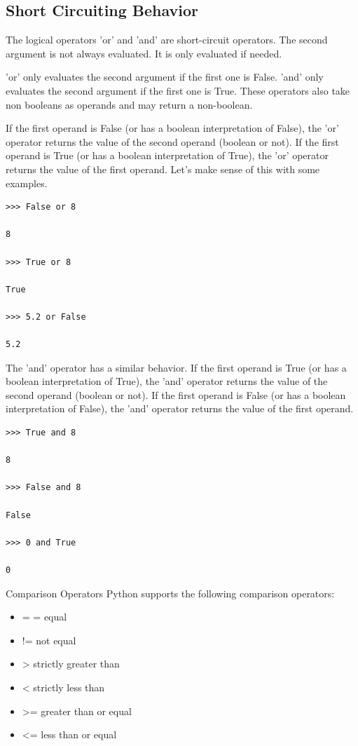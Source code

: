 \documentclass{article}
\begin{document}
\subsection{Short Circuiting Behavior}
The logical operators 'or' and 'and' are short-circuit operators.  The second argument is not always evaluated.  It is only evaluated if needed.

'or' only evaluates the second argument if the first one is False.
'and' only evaluates the second argument if the first one is True.
These operators also take non booleans as operands and may return a non-boolean.

If the first operand is False  (or has a boolean interpretation of False), the 'or' operator returns the value of the second operand (boolean or not).  If the first operand is True (or has a boolean interpretation of True), the 'or' operator returns the value of the first operand.  Let's make sense of this with some examples.

\begin{lstlisting}
>>> False or 8

8

>>> True or 8

True

>>> 5.2 or False

5.2

\end{lstlisting}

The 'and' operator has a similar behavior.  If the first operand is True  (or has a boolean interpretation of True), the 'and' operator returns the value of the second operand (boolean or not).  If the first operand is False (or has a boolean interpretation of False), the 'and' operator returns the value of the first operand. 

\begin{lstlisting}
>>> True and 8

8

>>> False and 8

False

>>> 0 and True

0

\end{lstlisting}

Comparison Operators
Python supports the following comparison operators:
\begin{itemize}


\item = =    equal

\item !=      not equal

\item >       strictly greater than

\item <       strictly less than

\item >=     greater than or equal

\item <=     less than or equal

\end{itemize}
\end{document}
